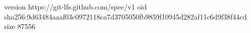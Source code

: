 version https://git-lfs.github.com/spec/v1
oid sha256:9d63484aaaf03c0972118ca7d3705050fb9859f10945d282af11c6d9f38f44cd
size 87556
